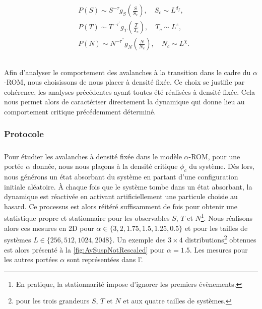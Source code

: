 \begin{equation}
	\begin{aligned}
		&P(S) \sim S^{-\tau}g_S\left( \frac{S}{S_c} \right), \quad S_c \sim L^{d_f},\\
		&P(T) \sim T^{-\tau^\prime}g_T\left( \frac{T}{T_c} \right), \quad T_c \sim L^{z},\\
		&P(N) \sim N^{-\tau^{\prime\prime}}g_N\left( \frac{N}{N_c} \right), \quad N_c \sim L^{\chi}.\\
	\end{aligned}
	\label{eq:AvDistribSusp}
\end{equation}

\subparagraph{}Afin d'analyser le comportement des avalanches à la transition dans le cadre du $\alpha$-ROM, nous choisissons de nous placer à densité fixée. Ce choix se justifie par cohérence, les analyses précédentes ayant toutes été réalisées à densité fixée. Cela nous permet alors de caractériser directement la dynamique qui donne lieu au comportement critique précédemment déterminé.

\subsubsection{Protocole}

\subparagraph{}Pour étudier les avalanches à densité fixée dans le modèle $\alpha$-ROM, pour une portée $\alpha$ donnée, nous nous plaçons à la densité critique $\phi_c$ du système. Dès lors, nous générons un état absorbant du système en partant d'une configuration initiale aléatoire. \`A chaque fois que le système tombe dans un état absorbant, la dynamique est réactivée en activant artificiellement une particule choisie au hasard. Ce processus est alors réitéré suffisamment de fois pour obtenir une statistique propre et stationnaire pour les observables $S$, $T$ et $N$\footnote{En pratique, la stationnarité impose d'ignorer les premiers évènements.}. Nous réalisons alors ces mesures en 2D pour $\alpha \in \{ 3, 2, 1.75, 1.5, 1.25, 0.5\}$ et pour les tailles de systèmes $L \in \{ 256, 512, 1024, 2048 \}$. Un exemple des $3\times 4$ distributions\footnote{pour les trois grandeurs $S$, $T$ et $N$ et aux quatre tailles de systèmes.} obtenues est alors présenté à la \autoref{fig:AvSuspNotRescaled} pour $\alpha = 1.5$. Les mesures pour les autres portées $\alpha$ sont représentées dans l'.

